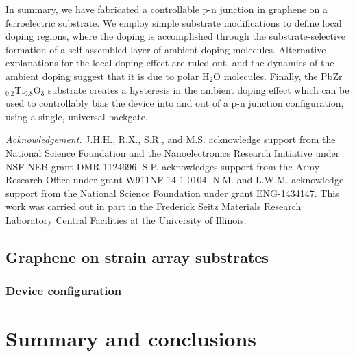 \documentclass[edeposit,fullpage,draftthesis]{uiucthesis2009}
\begin{document}
        In summary, we have fabricated a controllable p-n junction in graphene on a ferroelectric substrate. We employ simple substrate modifications to define local doping regions, where the doping is accomplished through the substrate-selective formation of a self-assembled layer of ambient doping molecules. Alternative explanations for the local doping effect are ruled out, and the dynamics of the ambient doping suggest that it is due to polar H$_2$O molecules. Finally, the PbZr$_{0.2}$Ti$_{0.8}$O$_3$ substrate creates a hysteresis in the ambient doping effect which can be used to controllably bias the device into and out of a p-n junction configuration, using a single, universal backgate.



\textit{Acknowledgement.} J.H.H., R.X., S.R., and M.S. acknowledge support from the National Science Foundation and the Nanoelectronics Research Initiative under NSF-NEB grant DMR-1124696.
S.P. acknowledges support from the Army Research Office under grant W911NF-14-1-0104. N.M. and L.W.M. acknowledge support from the National Science Foundation under grant ENG-1434147. This work was carried out in part in the Frederick Seitz Materials Research Laboratory Central Facilities at the University of Illinois.



\section{Graphene on strain array substrates}
    \subsection{Device configuration}


\chapter{Summary and conclusions}
\end{document}
